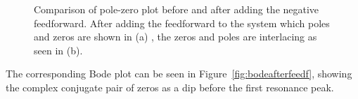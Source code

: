 \begin{figure}[h!]
  \centering %
  \qquad
  \caption{\label{fig:negfeedpzmap} Comparison of pole-zero plot before and after adding the negative feedforward. After adding the feedforward to the system which poles and zeros are shown in (a) , the zeros and poles are interlacing as seen in (b).}
\end{figure}

The corresponding Bode plot can be seen in Figure~\ref{fig:bodeafterfeedf}, showing the complex conjugate pair of zeros as a dip before the first resonance peak.

